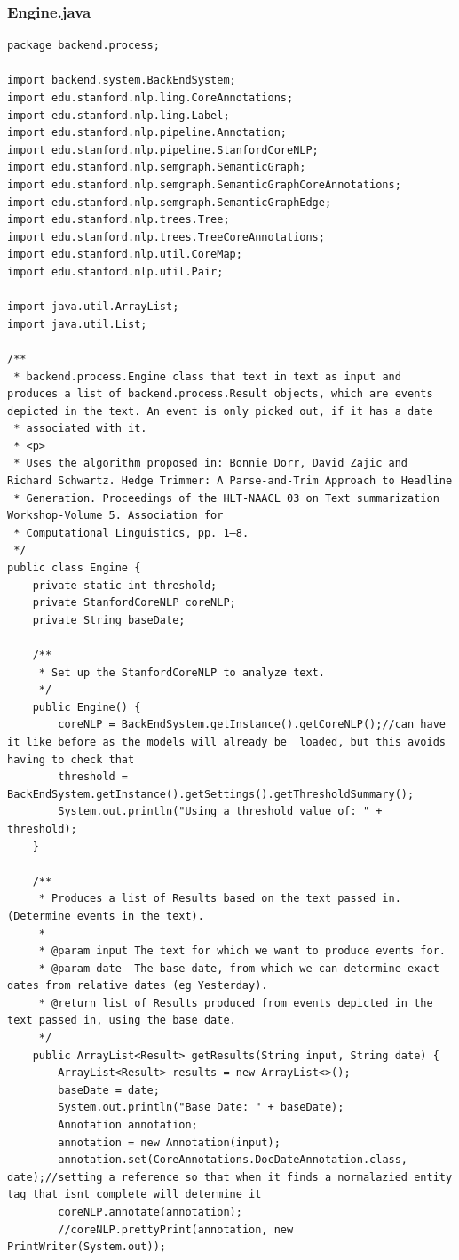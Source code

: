 \subsubsection{Engine.java}
\begin{lstlisting}
package backend.process;

import backend.system.BackEndSystem;
import edu.stanford.nlp.ling.CoreAnnotations;
import edu.stanford.nlp.ling.Label;
import edu.stanford.nlp.pipeline.Annotation;
import edu.stanford.nlp.pipeline.StanfordCoreNLP;
import edu.stanford.nlp.semgraph.SemanticGraph;
import edu.stanford.nlp.semgraph.SemanticGraphCoreAnnotations;
import edu.stanford.nlp.semgraph.SemanticGraphEdge;
import edu.stanford.nlp.trees.Tree;
import edu.stanford.nlp.trees.TreeCoreAnnotations;
import edu.stanford.nlp.util.CoreMap;
import edu.stanford.nlp.util.Pair;

import java.util.ArrayList;
import java.util.List;

/**
 * backend.process.Engine class that text in text as input and produces a list of backend.process.Result objects, which are events depicted in the text. An event is only picked out, if it has a date
 * associated with it.
 * <p>
 * Uses the algorithm proposed in: Bonnie Dorr, David Zajic and Richard Schwartz. Hedge Trimmer: A Parse-and-Trim Approach to Headline
 * Generation. Proceedings of the HLT-NAACL 03 on Text summarization Workshop-Volume 5. Association for
 * Computational Linguistics, pp. 1–8.
 */
public class Engine {
    private static int threshold;
    private StanfordCoreNLP coreNLP;
    private String baseDate;

    /**
     * Set up the StanfordCoreNLP to analyze text.
     */
    public Engine() {
        coreNLP = BackEndSystem.getInstance().getCoreNLP();//can have it like before as the models will already be  loaded, but this avoids having to check that
        threshold = BackEndSystem.getInstance().getSettings().getThresholdSummary();
        System.out.println("Using a threshold value of: " + threshold);
    }

    /**
     * Produces a list of Results based on the text passed in. (Determine events in the text).
     *
     * @param input The text for which we want to produce events for.
     * @param date  The base date, from which we can determine exact dates from relative dates (eg Yesterday).
     * @return list of Results produced from events depicted in the text passed in, using the base date.
     */
    public ArrayList<Result> getResults(String input, String date) {
        ArrayList<Result> results = new ArrayList<>();
        baseDate = date;
        System.out.println("Base Date: " + baseDate);
        Annotation annotation;
        annotation = new Annotation(input);
        annotation.set(CoreAnnotations.DocDateAnnotation.class, date);//setting a reference so that when it finds a normalazied entity tag that isnt complete will determine it
        coreNLP.annotate(annotation);
        //coreNLP.prettyPrint(annotation, new PrintWriter(System.out));


\end{lstlisting}
